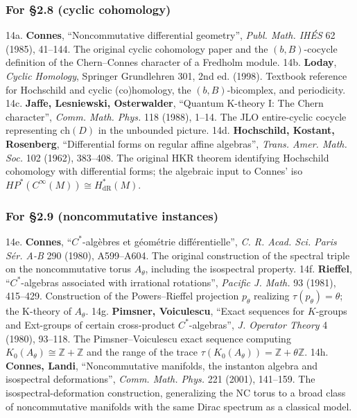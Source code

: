 \documentclass[
  11pt,
]{article}
\begin{document}
\subsubsection{For §2.8 (cyclic
cohomology)}\label{for-2.8-cyclic-cohomology}

14a. \textbf{Connes}, ``Noncommutative differential geometry'',
\emph{Publ. Math. IHÉS} 62 (1985), 41--144. The original cyclic
cohomology paper and the \((b, B)\)-cocycle definition of the
Chern--Connes character of a Fredholm module. 14b. \textbf{Loday},
\emph{Cyclic Homology}, Springer Grundlehren 301, 2nd ed. (1998).
Textbook reference for Hochschild and cyclic (co)homology, the
\((b, B)\)-bicomplex, and periodicity. 14c. \textbf{Jaffe, Lesniewski,
Osterwalder}, ``Quantum K-theory I: The Chern character'', \emph{Comm.
Math. Phys.} 118 (1988), 1--14. The JLO entire-cyclic cocycle
representing \(\mathrm{ch}(D)\) in the unbounded picture. 14d.
\textbf{Hochschild, Kostant, Rosenberg}, ``Differential forms on regular
affine algebras'', \emph{Trans. Amer. Math. Soc.} 102 (1962), 383--408.
The original HKR theorem identifying Hochschild cohomology with
differential forms; the algebraic input to Connes' iso
\(HP^*(C^\infty(M)) \cong H^*_{\mathrm{dR}}(M)\).

\subsubsection{For §2.9 (noncommutative
instances)}\label{for-2.9-noncommutative-instances}

14e. \textbf{Connes}, ``\(C^*\)-algèbres et géométrie différentielle'',
\emph{C. R. Acad. Sci. Paris Sér. A-B} 290 (1980), A599--A604. The
original construction of the spectral triple on the noncommutative torus
\(A_\theta\), including the isospectral property. 14f. \textbf{Rieffel},
``\(C^*\)-algebras associated with irrational rotations'', \emph{Pacific
J. Math.} 93 (1981), 415--429. Construction of the Powers--Rieffel
projection \(p_\theta\) realizing \(\tau(p_\theta) = \theta\); the
K-theory of \(A_\theta\). 14g. \textbf{Pimsner, Voiculescu}, ``Exact
sequences for \(K\)-groups and Ext-groups of certain cross-product
\(C^*\)-algebras'', \emph{J. Operator Theory} 4 (1980), 93--118. The
Pimsner--Voiculescu exact sequence computing
\(K_0(A_\theta) \cong \mathbb{Z}+ \mathbb{Z}\) and the range of the
trace \(\tau(K_0(A_\theta)) = \mathbb{Z}+ \theta\mathbb{Z}\). 14h.
\textbf{Connes, Landi}, ``Noncommutative manifolds, the instanton
algebra and isospectral deformations'', \emph{Comm. Math. Phys.} 221
(2001), 141--159. The isospectral-deformation construction, generalizing
the NC torus to a broad class of noncommutative manifolds with the same
Dirac spectrum as a classical model.
\end{document}

